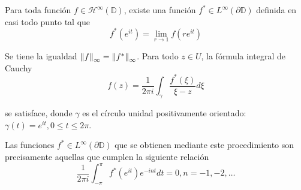 \begin{theorem}
Para toda función $f \in \mathcal{H}^\infty(\mathbb{D})$, existe una función $f^* \in L^{\infty} (\partial \mathbb{D})$ definida en casi todo punto tal que
\begin{equation}
\label{fatou1}
f^*(e^{it}) = \lim_{r \rightarrow 1} f(re^{it})
\end{equation}

Se tiene la igualdad $\left\lVert f\right\rVert_{\infty} = \left\lVert f^*\right\rVert_{\infty}$. Para todo $z \in U$, la fórmula integral de Cauchy
\begin{equation}
\label{fatou2}
f(z) = \dfrac{1}{2 \pi i} \int_{\gamma} \dfrac{f^*(\xi)}{\xi - z} d\xi
\end{equation}

se satisface, donde $\gamma$ es el círculo unidad positivamente orientado: $\gamma(t) = e^{it}, 0 \leq t \leq 2 \pi$.

Las funciones $f^* \in L^{\infty}(\partial \mathbb{D})$ que se obtienen mediante este procedimiento son precisamente aquellas que cumplen la siguiente relación
\begin{equation}
\label{fatou3}
\dfrac{1}{2 \pi i} \int_{-\pi}^{\pi} f^*(e^{it})e^{-int} dt = 0, n = -1,-2, \dots
\end{equation}
\end{theorem}


